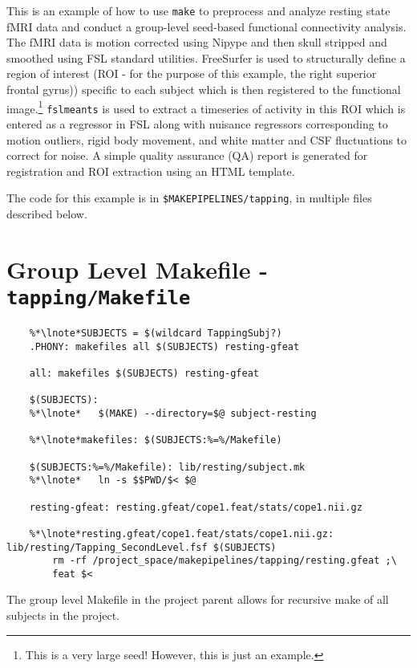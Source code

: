 \label{example:fcconnectivity2}
This is an example of how to use \texttt{make} to preprocess and
analyze resting state fMRI data and conduct a group-level seed-based
functional connectivity
analysis. The fMRI data is motion corrected using Nipype
\citep{nipype2011} and then skull stripped and smoothed using FSL
\citep{jenkinson2012fsl} standard utilities. FreeSurfer is used to
structurally define a region of interest (ROI - for the purpose of
this example, the right superior frontal gyrus)) specific to each
subject which is then registered to the functional
image.\footnote{This is a very large seed! However, this is just an
  example.} \texttt{fslmeants} is used to extract a timeseries of
activity in this ROI which is entered as a regressor in FSL along with
nuisance regressors corresponding to motion outliers, rigid body
movement, and white matter and CSF fluctuations to correct for
noise. A simple quality assurance (QA) report is generated for
registration and ROI extraction using an HTML template.

The code for this example is in \texttt{\$MAKEPIPELINES/tapping}, in
multiple files described below.

\section{Group Level Makefile - \texttt{tapping/Makefile}}
\begin{lstlisting}
	%*\lnote*SUBJECTS = $(wildcard TappingSubj?)
	.PHONY: makefiles all $(SUBJECTS) resting-gfeat
	
	all: makefiles $(SUBJECTS) resting-gfeat
	
	$(SUBJECTS):
	%*\lnote*	$(MAKE) --directory=$@ subject-resting

	%*\lnote*makefiles: $(SUBJECTS:%=%/Makefile)
	
	$(SUBJECTS:%=%/Makefile): lib/resting/subject.mk
	%*\lnote*	ln -s $$PWD/$< $@
	
	resting-gfeat: resting.gfeat/cope1.feat/stats/cope1.nii.gz
	
	%*\lnote*resting.gfeat/cope1.feat/stats/cope1.nii.gz: lib/resting/Tapping_SecondLevel.fsf $(SUBJECTS)
		rm -rf /project_space/makepipelines/tapping/resting.gfeat ;\
		feat $<
\end{lstlisting}

The group level Makefile in the project parent allows for recursive make of all subjects in the project. 

